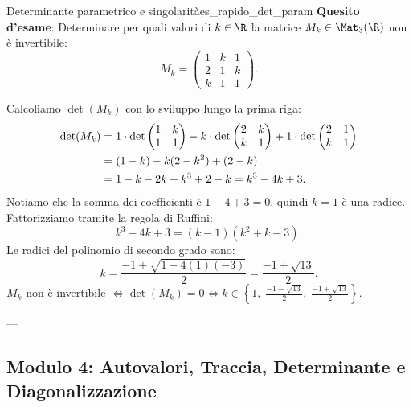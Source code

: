 \begin{esempio}{Determinante parametrico e singolarità}{es_rapido_det_param}
\textbf{Quesito d'esame}: Determinare per quali valori di $k \in \R$ la matrice $M_k \in \Mat_3(\R)$ non è invertibile:
\begin{equation}
    M_k = \begin{pmatrix} 1 & k & 1 \\ 2 & 1 & k \\ k & 1 & 1 \end{pmatrix}.
\end{equation}

\begin{dimostrazione}[Risoluzione]
Calcoliamo $\det(M_k)$ con lo sviluppo lungo la prima riga:
\begin{align}
    \det(M_k) &= 1 \cdot \det \begin{pmatrix} 1 & k \\ 1 & 1 \end{pmatrix} - k \cdot \det \begin{pmatrix} 2 & k \\ k & 1 \end{pmatrix} + 1 \cdot \det \begin{pmatrix} 2 & 1 \\ k & 1 \end{pmatrix} \notag \\
    &= (1 - k) - k(2 - k^2) + (2 - k) \notag \\
    &= 1 - k - 2k + k^3 + 2 - k = k^3 - 4k + 3.
\end{align}
Notiamo che la somma dei coefficienti è $1 - 4 + 3 = 0$, quindi $k = 1$ è una radice. Fattorizziamo tramite la regola di Ruffini:
\begin{equation}
    k^3 - 4k + 3 = (k - 1)(k^2 + k - 3).
\end{equation}
Le radici del polinomio di secondo grado sono:
\begin{equation}
    k = \frac{-1 \pm \sqrt{1 - 4(1)(-3)}}{2} = \frac{-1 \pm \sqrt{13}}{2}.
\end{equation}
$M_k$ non è invertibile $\iff \det(M_k) = 0 \iff k \in \left\{ 1, \; \frac{-1 - \sqrt{13}}{2}, \; \frac{-1 + \sqrt{13}}{2} \right\}$.
\end{dimostrazione}
\end{esempio}

---

\subsection{Modulo 4: Autovalori, Traccia, Determinante e Diagonalizzazione}

